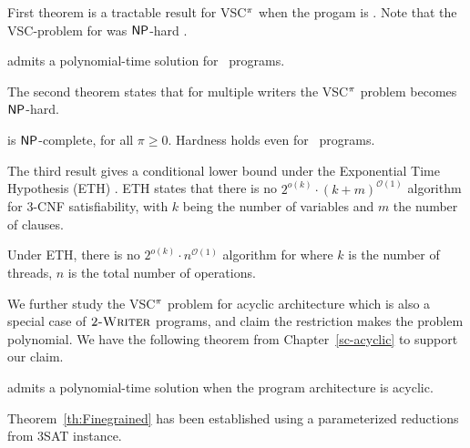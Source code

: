 First theorem is a tractable result for VSC$^\pi$ when the progam is  \onewriter{}. Note that the VSC-problem for \onewriter{} was $\mathsf{NP}$-hard \cite{Gibbons}.

\begin{theorem}\label{th:onewriter} \vscp  admits a polynomial-time solution for \onewriter\ programs.  
\end{theorem}

The second theorem states that for multiple writers the VSC$^\pi$ problem becomes $\mathsf{NP}$-hard.

\begin{theorem}\label{th:NPhardness}
\vscp is $\mathsf{NP}$-complete, for all $\pi \ge 0$. Hardness holds even for \twowriter\ programs. 
\end{theorem}

The third result gives a conditional lower bound under the Exponential Time Hypothesis (ETH) \cite{CyganFKLMPPS15,fine-grained-complexity}. ETH states that there is no $2^{o(k)} \cdot (k + m)^{\mathcal{O}(1)}$ algorithm for 3-CNF satisfiability, with $k$ being the number of variables and $m$ the number of clauses. 

\begin{theorem} \label{scFinegrained}\label{th:Finegrained}
Under ETH, there is no $2^{o(k)} \cdot n^{\mathcal{O}(1)}$ algorithm for \vscp where $k$ is the number of threads, $n$ is the total number of operations.
\end{theorem}

We further study the VSC$^\pi$ problem for acyclic architecture which is also a special case of $\textsc{2-Writer}$ programs, and  claim the restriction makes the problem polynomial. We have the following theorem from   Chapter~\ref{sc-acyclic}  to support our claim.

\begin{theorem} \label{th:scacyclic}
\vscp  admits a polynomial-time solution  when the program architecture is acyclic.  
\end{theorem}


Theorem~\ref{th:Finegrained} has been established using a parameterized reductions from 3SAT instance. 

